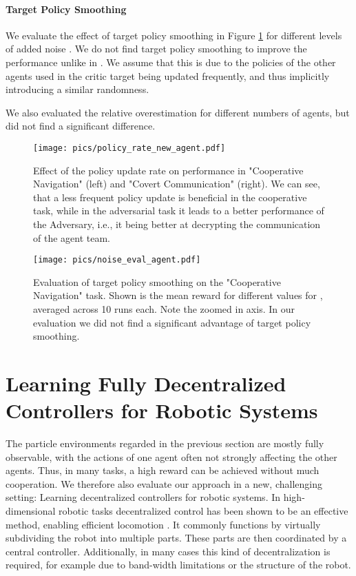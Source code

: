 \documentclass{article}
\begin{document}
\paragraph{Target Policy Smoothing}
We evaluate the effect of target policy smoothing in Figure \ref{fig:target_policy_smoothing} for different levels of added noise .
We do not find target policy smoothing to improve the performance unlike in \cite{Fujimoto2018}.
We assume that this is due to the policies of the other agents used in the critic target being updated frequently, and thus implicitly introducing a similar randomness.

We also evaluated the relative overestimation for different numbers of agents, but did not find a significant difference.

\begin{figure}
	\begin{minipage}[t]{0.48\textwidth}
		\centering
		\texttt{[image: pics/policy\_rate\_new\_agent.pdf]}
		\caption{Effect of the policy update rate  on performance in "Cooperative Navigation" (left) and "Covert Communication" (right). 
			We can see, that a less frequent policy update is beneficial in the cooperative task, while in the adversarial task it leads to a better performance of the Adversary, i.e., it being better at decrypting the communication of the agent team.}
		\label{fig:pol_rate}
	\end{minipage}
	\hfill
	\begin{minipage}[t]{0.48\textwidth}
		\texttt{[image: pics/noise\_eval\_agent.pdf]}
		\centering
		\caption{Evaluation of target policy smoothing on the "Cooperative Navigation" task. Shown is the mean reward for different values for , averaged across 10 runs each. Note the zoomed in axis. In our evaluation we did not find a significant advantage of target policy smoothing.}
		\label{fig:target_policy_smoothing}
		\vspace{-0.5cm}
	\end{minipage}
\end{figure}
\vspace{-1.5mm}
\section{Learning Fully Decentralized Controllers for Robotic Systems}
\vspace{-1.5mm}
\label{sec:robot-decentral}
The particle environments regarded in the previous section are mostly fully observable, with the actions of one agent often not strongly affecting the other agents.
Thus, in many tasks, a high reward can be achieved without much cooperation.
We therefore also evaluate our approach in a new, challenging setting: Learning decentralized controllers for robotic systems.
In high-dimensional robotic tasks decentralized control has been shown to be an effective method, enabling efficient locomotion \cite{Whitman2016}. 
It commonly functions by virtually subdividing the robot into multiple parts. 
These parts are then coordinated by a central controller.
Additionally, in many cases this kind of decentralization is required, for example due to band-width limitations or the structure of the robot.
\end{document}
